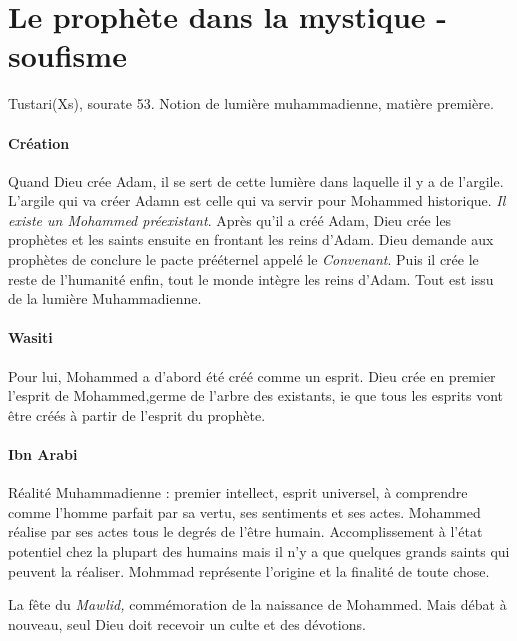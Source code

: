 \section{Le prophète dans la mystique - soufisme }

Tustari(Xs),  sourate 53.
Notion de lumière muhammadienne, matière première.
\paragraph{Création}
Quand Dieu crée Adam, il se sert de cette lumière dans laquelle il y a de l'argile. L'argile qui va créer Adamn est celle qui va servir pour Mohammed historique. \textit{Il existe un Mohammed préexistant}. Après qu'il a créé Adam, Dieu crée les prophètes et les saints ensuite en frontant les reins d'Adam. Dieu demande aux prophètes de conclure le pacte prééternel appelé le \textit{Convenant}. 
Puis il crée le reste de l'humanité enfin, tout le monde intègre les reins d'Adam.
Tout est issu de la lumière Muhammadienne.

\paragraph{Wasiti} Pour lui, Mohammed a d'abord été créé comme un esprit. Dieu crée en premier l'esprit de Mohammed,germe de l'arbre des existants, ie que tous les esprits vont être créés à partir de l'esprit  du prophète. 

\paragraph{Ibn Arabi} Réalité Muhammadienne : premier intellect, esprit universel, à comprendre comme l'homme parfait par sa vertu, ses sentiments et ses actes. Mohammed réalise par ses actes tous le degrés de l'être humain. Accomplissement à l'état potentiel chez la plupart des humains mais il n'y a que quelques grands saints qui peuvent la réaliser. Mohmmad représente l'origine et la finalité de toute chose.

La fête du \textit{Mawlid, } commémoration de la naissance de Mohammed. Mais débat à nouveau, seul Dieu doit recevoir un culte et des dévotions.


